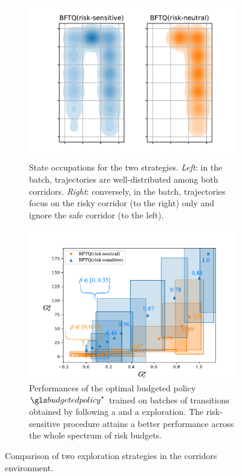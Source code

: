\begin{figure}[th]
	\centering
	\begin{subfigure}[t]{0.48\linewidth}
		\includegraphics[width=\linewidth]{img/corridors_densities.pdf}
		\caption{State occupations for the two strategies. \emph{Left}: in the  batch, trajectories are well-distributed among both corridors. \emph{Right}: conversely, in the  batch, trajectories focus on the risky corridor (to the right) only and ignore the safe corridor (to the left).}
		\label{fig:exploration-trajs}
	\end{subfigure}\hfill
	\begin{subfigure}[t]{0.48\linewidth}
	    \includegraphics[page=1, width=\textwidth]{img/corridors}
	    \caption{Performances of the optimal budgeted policy $\budgetedpolicy^\star$ trained on batches of transitions obtained by following a  and a  exploration. The risk-sensitive procedure attains a better performance across the whole spectrum of risk budgets.}
	    \label{fig:exploration-perfs}
	\end{subfigure}
	\caption{Comparison of two exploration strategies in the corridors environment. }
	\label{fig:exploration}
\end{figure}


